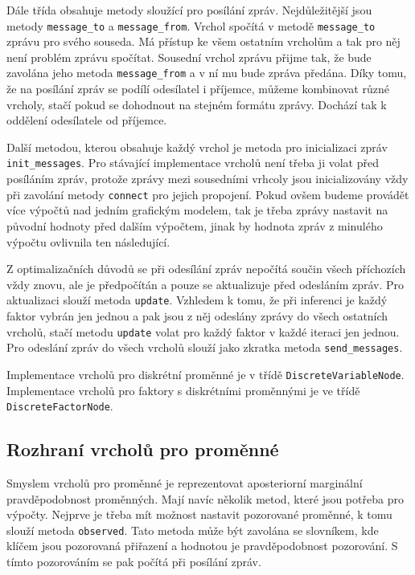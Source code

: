 Dále třída obsahuje metody sloužící pro posílání zpráv.
Nejdůležitější jsou metody \texttt{message\_to} a \texttt{message\_from}.
Vrchol spočítá v metodě \texttt{message\_to} zprávu pro svého souseda.
Má přístup ke všem ostatním vrcholům a tak pro něj není problém zprávu spočítat.
Sousední vrchol zprávu přijme tak, že bude zavolána jeho metoda \texttt{message\_from} a v ní mu bude zpráva předána.
Díky tomu, že na posílání zpráv se podílí odesílatel i příjemce, můžeme kombinovat různé vrcholy, stačí pokud se dohodnout na stejném formátu zprávy.
Dochází tak k oddělení odesílatele od příjemce.

Další metodou, kterou obsahuje každý vrchol je metoda pro inicializaci zpráv \texttt{init\_messages}. 
Pro stávající implementace vrcholů není třeba ji volat před posíláním zpráv, protože zprávy mezi sousedními vrhcoly jsou inicializovány vždy při zavolání metody \texttt{connect} pro jejich propojení.
Pokud ovšem budeme provádět více výpočtů nad jedním grafickým modelem, tak je třeba zprávy nastavit na původní hodnoty před dalším výpočtem, jinak by hodnota zpráv z minulého výpočtu ovlivnila ten následující.

Z optimalizačních důvodů se při odesílání zpráv nepočítá součin všech příchozích vždy znovu, ale je předpočítán a pouze se aktualizuje před odesláním zpráv.
Pro aktualizaci slouží metoda \texttt{update}.
Vzhledem k tomu, že při inferenci je každý faktor vybrán jen jednou a pak jsou z něj odeslány zprávy do všech ostatních vrcholů, stačí metodu \texttt{update} volat pro každý faktor v každé iteraci jen jednou.
Pro odeslání zpráv do všech vrcholů slouží jako zkratka metoda \texttt{send\_messages}.

Implementace vrcholů pro diskrétní proměnné je v třídě \texttt{DiscreteVariableNode}.
Implementace vrcholů pro faktory s diskrétními proměnnými je ve třídě \texttt{DiscreteFactorNode}. 

\subsection{Rozhraní vrcholů pro proměnné}

Smyslem vrcholů pro proměnné je reprezentovat aposteriorní marginální pravděpodobnost proměnných.
Mají navíc několik metod, které jsou potřeba pro výpočty.
Nejprve je třeba mít možnost nastavit pozorované proměnné, k tomu slouží metoda \texttt{observed}.
Tato metoda může být zavolána se slovníkem, kde klíčem jsou pozorovaná přiřazení a hodnotou je pravděpodobnost pozorování.
S tímto pozorováním se pak počítá při posílání zpráv.


